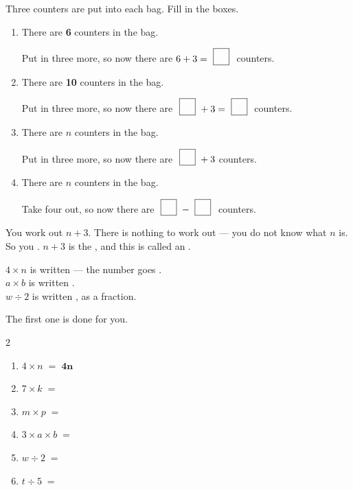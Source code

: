 \documentclass[12pt,a4paper]{article}
\newcommand{\nbox}{\ \fbox{\rule{0pt}{1.05em}\rule{1.0em}{0pt}}\ }
\begin{document}

\noindent Three counters are put into each bag. Fill in the boxes.

\vspace{4pt}
\begin{enumerate}[label=(\alph*), itemsep=13pt]
  \item There are \textbf{6} counters in the bag.

        Put in three more, so now there are \; $6 + 3 = \nbox$ \; counters.

  \item There are \textbf{10} counters in the bag.

        Put in three more, so now there are \; $\nbox + 3 = \nbox$ \; counters.

  \item There are \textbf{$n$} counters in the bag.

        Put in three more, so now there are \; $\nbox + 3$ \; counters.

  \item There are \textbf{$n$} counters in the bag.

        Take four out, so now there are \; $\nbox - \nbox$ \; counters.
\end{enumerate}

\begin{remember}
  You  work out $n + 3$. There is nothing to work out --- you do not
  know what $n$ is. So you . $n + 3$ is the
  , and this is called an .
\end{remember}


\begin{remember}
  $4 \times n$ is written  --- the number goes . \\
  $a \times b$ is written . \\
  $w \div 2$ is written , as a fraction.
\end{remember}

\noindent The first one is done for you.

\vspace{6pt}
\begin{multicols}{2}
\begin{enumerate}[label=(\alph*), itemsep=12pt]
  \item $4 \times n \;=\; \mathbf{4n}$
  \item $7 \times k \;=\;$ \blank[2.0cm]
  \item $m \times p \;=\;$ \blank[2.0cm]
  \item $3 \times a \times b \;=\;$ \blank[2.0cm]
  \item $w \div 2 \;=\;$ \blank[2.0cm]
  \item $t \div 5 \;=\;$ \blank[2.0cm]
\end{enumerate}
\end{multicols}
\end{document}
